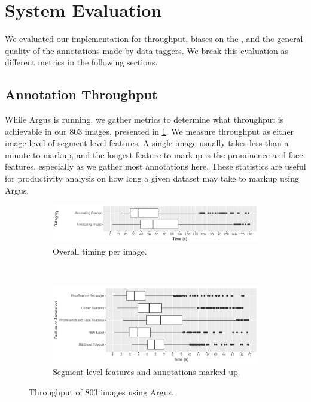 \section{System Evaluation}

We evaluated our implementation for throughput, biases on the , and the general quality of the annotations made by data taggers. We break this evaluation as different metrics in the following sections.

\subsection{Annotation Throughput}
\label{sec:dataset:argus:metrics}

While Argus is running, we gather metrics to determine what throughput is achievable in our 803 images, presented in  \cref{fig:dataset:argus:metrics:throughput}. We measure throughput as either image-level of segment-level features. A single image usually takes less than a minute to markup, and the longest feature to markup is the prominence and face features, especially as we gather most annotations here. These statistics are useful for productivity analysis on how long a given dataset may take to markup using Argus.

\begin{figure}[h]
  \begin{subfigure}[b]{\textwidth}
    \includegraphics[width=\textwidth]{images/dataset/argus/photo_box_plots}
    \caption{Overall timing per image.}   
  \end{subfigure}
  \smallskip
  \\
  \begin{subfigure}[b]{\textwidth}
    \includegraphics[width=\textwidth]{images/dataset/argus/feature_box_plots}
    \caption{Segment-level features and annotations marked up.}   
  \end{subfigure}
  \caption[Throughput of images using Argus]{Throughput of 803 images using Argus.}
  \label{fig:dataset:argus:metrics:throughput}
\end{figure}

